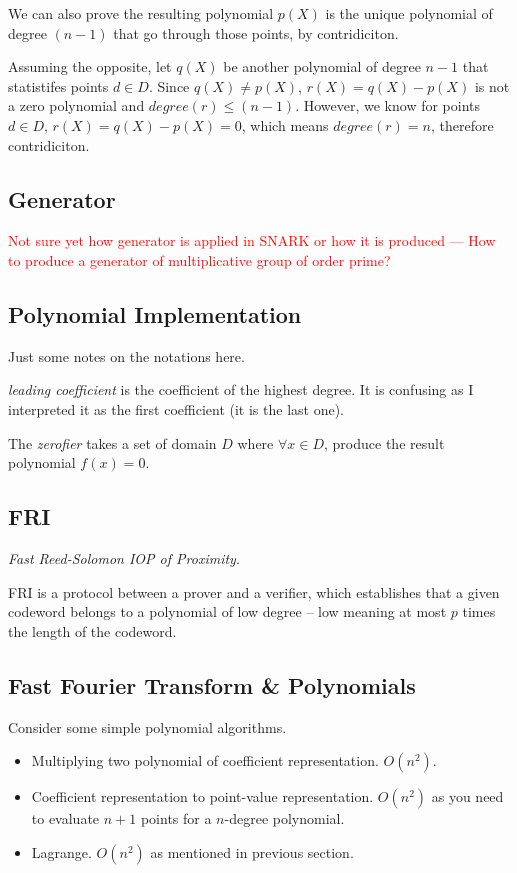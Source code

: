 \documentclass[10pt]{article}
\newcommand{\HL}[1]{\textcolor{red}{#1}}
\begin{document}
We can also prove the resulting polynomial $p(X)$ is the unique polynomial of
degree $(n-1)$ that go through those points, by contridiciton.

Assuming the opposite, let $q(X)$ be another polynomial of degree $n-1$ that
statistifes points $d \in D$. Since $q(X) \neq p(X)$, $r(X) = q(X) - p(X)$ is
not a zero polynomial and $degree(r) \leq (n-1)$. However, we know for
points $d \in D$, $r(X) = q(X) - p(X) = 0$, which means $degree(r) = n$,
therefore contridiciton.

\subsection{Generator}
\HL{Not sure yet how generator is applied in SNARK or how it is produced ---
How to produce a generator of multiplicative group of order prime?}

\subsection{Polynomial Implementation}
Just some notes on the notations here. 
\begin{description}
    \item \emph{leading coefficient} is the coefficient of the highest degree. It is
confusing as I interpreted it as the first coefficient (it is the last one).
    \item The \emph{zerofier} takes a set of domain $D$ where $\forall x \in D$, produce the
        result polynomial $f(x) = 0$.
\end{description}

\subsection{FRI}
\emph{Fast Reed-Solomon IOP of Proximity}.

FRI is a protocol between a prover and a verifier, which establishes that a
given codeword belongs to a polynomial of low degree – low meaning at most $p$
times the length of the codeword. 

\subsection{Fast Fourier Transform \& Polynomials}
Consider some simple polynomial algorithms.
\begin{itemize}
    \item Multiplying two polynomial of coefficient representation. $O(n^2)$.
    \item Coefficient representation to point-value representation. $O(n^2)$ as
        you need to evaluate $n+1$ points for a $n$-degree polynomial.
    \item Lagrange. $O(n^2)$ as mentioned in previous section.
\end{itemize}
\end{document}
